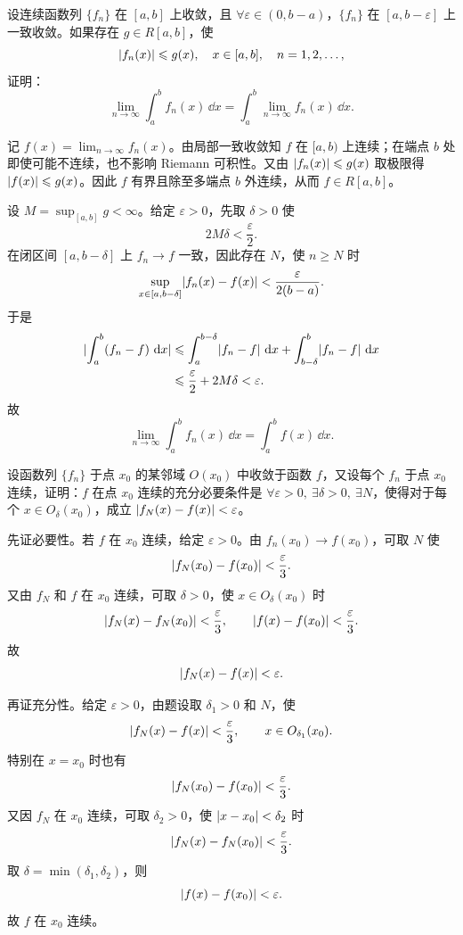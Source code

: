 \begin{xexercise}[5]
设连续函数列 $\{f_n\}$ 在 $[a,b]$ 上收敛，且 $\forall\varepsilon\in(0,b-a)$，$\{f_n\}$ 在 $[a,b-\varepsilon]$ 上一致收敛。如果存在 $g\in R[a,b]$，使
  \[
    \lvert f_n(x)\rvert\leqslant g(x),\quad x\in[a,b],\quad n=1,2,\ldots,
  \]
  证明：
  \[
    \lim_{n\to\infty}\int_a^b f_n(x)\,\dd x=\int_a^b\lim_{n\to\infty}f_n(x)\,\dd x.
  \]
\end{xexercise}
\begin{xsolution}
记 $f(x)=\lim_{n\to\infty}f_n(x)$。由局部一致收敛知 $f$ 在 $[a,b)$ 上连续；在端点 $b$ 处即使可能不连续，也不影响 Riemann 可积性。又由 $\lvert f_n(x)\rvert\leqslant g(x)$ 取极限得 $\lvert f(x)\rvert\leqslant g(x)$。因此 $f$ 有界且除至多端点 $b$ 外连续，从而 $f\in R[a,b]$。

设 $M=\sup_{[a,b]}g<\infty$。给定 $\varepsilon>0$，先取 $\delta>0$ 使
\[
  2M\delta<\frac\varepsilon2.
\]
在闭区间 $[a,b-\delta]$ 上 $f_n\to f$ 一致，因此存在 $N$，使 $n\geqslant N$ 时
\[
  \sup_{x\in[a,b-\delta]}\lvert f_n(x)-f(x)\rvert
  <\frac{\varepsilon}{2(b-a)}.
\]
于是
\[
\begin{aligned}
  \lvert\int_a^b(f_n-f)\,\mathop{}\!\mathrm{d} x\rvert
  &\leqslant\int_a^{b-\delta}\lvert f_n-f\rvert\,\mathop{}\!\mathrm{d} x
  +\int_{b-\delta}^b\lvert f_n-f\rvert\,\mathop{}\!\mathrm{d} x\\
  &\leqslant\frac\varepsilon2+2M\delta<\varepsilon.
\end{aligned}
\]
故
\[
  \lim_{n\to\infty}\int_a^b f_n(x)\,\dd x
  =\int_a^b f(x)\,\dd x.
\]
\end{xsolution}


\begin{xexercise}[6]
设函数列 $\{f_n\}$ 于点 $x_0$ 的某邻域 $O(x_0)$ 中收敛于函数 $f$，又设每个 $f_n$ 于点 $x_0$ 连续，证明：$f$ 在点 $x_0$ 连续的充分必要条件是 $\forall\varepsilon>0,\ \exists\delta>0,\ \exists N$，使得对于每个 $x\in O_\delta(x_0)$，成立 $\lvert f_N(x)-f(x)\rvert<\varepsilon$。
\end{xexercise}
\begin{xsolution}
先证必要性。若 $f$ 在 $x_0$ 连续，给定 $\varepsilon>0$。由 $f_n(x_0)\to f(x_0)$，可取 $N$ 使
\[
  \lvert f_N(x_0)-f(x_0)\rvert<\frac\varepsilon3.
\]
又由 $f_N$ 和 $f$ 在 $x_0$ 连续，可取 $\delta>0$，使 $x\in O_\delta(x_0)$ 时
\[
  \lvert f_N(x)-f_N(x_0)\rvert<\frac\varepsilon3,
  \qquad
  \lvert f(x)-f(x_0)\rvert<\frac\varepsilon3.
\]
故
\[
  \lvert f_N(x)-f(x)\rvert<\varepsilon.
\]

再证充分性。给定 $\varepsilon>0$，由题设取 $\delta_1>0$ 和 $N$，使
\[
  \lvert f_N(x)-f(x)\rvert<\frac\varepsilon3,
  \qquad x\in O_{\delta_1}(x_0).
\]
特别在 $x=x_0$ 时也有
\[
  \lvert f_N(x_0)-f(x_0)\rvert<\frac\varepsilon3.
\]
又因 $f_N$ 在 $x_0$ 连续，可取 $\delta_2>0$，使 $\lvert x-x_0\rvert<\delta_2$ 时
\[
  \lvert f_N(x)-f_N(x_0)\rvert<\frac\varepsilon3.
\]
取 $\delta=\min(\delta_1,\delta_2)$，则
\[
  \lvert f(x)-f(x_0)\rvert<\varepsilon.
\]
故 $f$ 在 $x_0$ 连续。
\end{xsolution}



